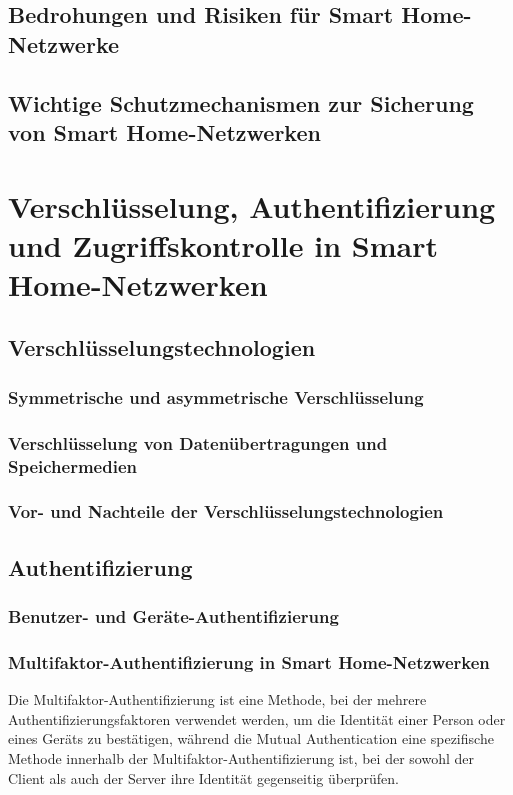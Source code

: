 \subsection{Bedrohungen und Risiken für Smart Home-Netzwerke}
\subsection{Wichtige Schutzmechanismen zur Sicherung von Smart Home-Netzwerken}

\newpage
\section{Verschlüsselung, Authentifizierung und Zugriffskontrolle in Smart Home-Netzwerken}
\subsection{Verschlüsselungstechnologien}
\subsubsection{Symmetrische und asymmetrische Verschlüsselung}
\subsubsection{Verschlüsselung von Datenübertragungen und Speichermedien}
\subsubsection{Vor- und Nachteile der Verschlüsselungstechnologien}

\subsection{Authentifizierung}
\subsubsection{Benutzer- und Geräte-Authentifizierung}
\subsubsection{Multifaktor-Authentifizierung in Smart Home-Netzwerken}
Die Multifaktor-Authentifizierung ist eine Methode, bei der mehrere Authentifizierungsfaktoren verwendet werden, um die Identität einer Person oder eines Geräts zu bestätigen, während die Mutual Authentication eine spezifische Methode innerhalb der Multifaktor-Authentifizierung ist, bei der sowohl der Client als auch der Server ihre Identität gegenseitig überprüfen.

